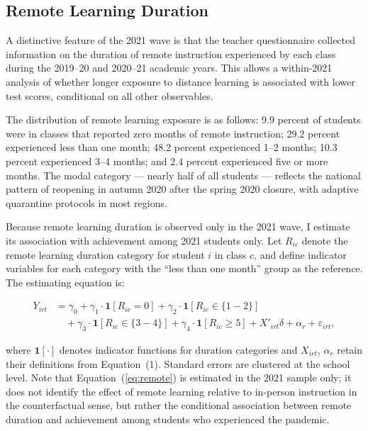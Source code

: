 \subsection{Remote Learning Duration}
\label{subsec:remote}

A distinctive feature of the 2021 wave is that the teacher questionnaire
collected information on the duration of remote instruction experienced
by each class during the 2019--20 and 2020--21 academic years. This
allows a within-2021 analysis of whether longer exposure to distance
learning is associated with lower test scores, conditional on all other
observables.

The distribution of remote learning exposure is as follows: 9.9 percent
of students were in classes that reported zero months of remote
instruction; 29.2 percent experienced less than one month; 48.2 percent
experienced 1--2 months; 10.3 percent experienced 3--4 months; and
2.4 percent experienced five or more months. The modal category --- nearly
half of all students --- reflects the national pattern of reopening in
autumn 2020 after the spring 2020 closure, with adaptive quarantine
protocols in most regions.

Because remote learning duration is observed only in the 2021 wave, I
estimate its association with achievement among 2021 students only.
Let $R_{ic}$ denote the remote learning duration category for student
$i$ in class $c$, and define indicator variables for each category with
the ``less than one month'' group as the reference. The estimating
equation is:

\begin{equation}
\begin{split}
Y_{irt} &= \gamma_0 + \gamma_1 \cdot \mathbf{1}[R_{ic} = 0]
           + \gamma_2 \cdot \mathbf{1}[R_{ic} \in \{1{-}2\}] \\
        &\quad + \gamma_3 \cdot \mathbf{1}[R_{ic} \in \{3{-}4\}]
           + \gamma_4 \cdot \mathbf{1}[R_{ic} \geq 5]
           + X'_{irt} \delta + \alpha_r + \varepsilon_{irt},
\end{split}
\label{eq:remote}
\end{equation}

\noindent where $\mathbf{1}[\cdot]$ denotes indicator functions for
duration categories and $X_{irt}$, $\alpha_r$ retain their definitions
from Equation~(1). Standard errors are clustered at the school level.
Note that Equation~(\ref{eq:remote}) is estimated in the 2021 sample
only; it does not identify the effect of remote learning relative to
in-person instruction in the counterfactual sense, but rather the
conditional association between remote duration and achievement among
students who experienced the pandemic.

